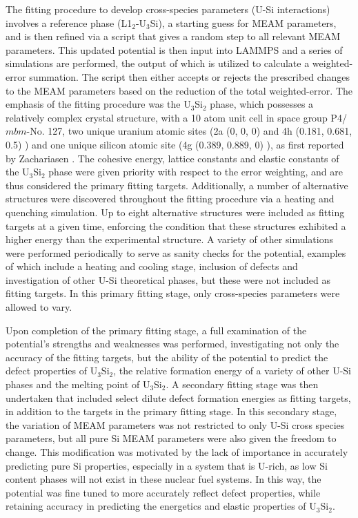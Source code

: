 \documentclass[review]{elsarticle}
\begin{document}
The fitting procedure to develop cross-species parameters (U-Si interactions) involves a reference phase (L1$_{2}$-U$_{3}$Si), a starting guess for MEAM parameters, and is then refined via a script that gives a random step to all relevant MEAM parameters.  This updated potential is then input into LAMMPS \cite{plimpton1995} and a series of simulations are performed, the output of which is utilized to calculate a weighted-error summation.  The script then either accepts or rejects the prescribed changes to the MEAM parameters based on the reduction of the total weighted-error.  The emphasis of the fitting procedure was the U$_{3}$Si$_{2}$ phase, which possesses a relatively complex crystal structure, with a 10 atom unit cell in space group P4/$\textit{mbm}$-No. 127, two unique uranium atomic sites (2a (0, 0, 0) and 4h (0.181, 0.681, 0.5) ) and one unique silicon atomic site (4g (0.389, 0.889, 0) ), as first reported by Zachariasen \cite{zachariasen1949}.  The cohesive energy, lattice constants and elastic constants of the U$_{3}$Si$_{2}$ phase were given priority with respect to the error weighting, and are thus considered the primary fitting targets.  Additionally, a number of alternative structures were discovered throughout the fitting procedure via a heating and quenching simulation.  Up to eight alternative structures were included as fitting targets at a given time, enforcing the condition that these structures exhibited a higher energy than the experimental structure.  A variety of other simulations were performed periodically to serve as sanity checks for the potential, examples of which include a heating and cooling stage, inclusion of defects and investigation of other U-Si theoretical phases, but these were not included as fitting targets.  In this primary fitting stage, only cross-species parameters were allowed to vary.  

Upon completion of the primary fitting stage, a full examination of the potential's strengths and weaknesses was performed, investigating not only the accuracy of the fitting targets, but the ability of the potential to predict the defect properties of U$_{3}$Si$_{2}$, the relative formation energy of a variety of other U-Si phases and the melting point of U$_{3}$Si$_{2}$.  A secondary fitting stage was then undertaken that included select dilute defect formation energies as fitting targets, in addition to the targets in the primary fitting stage.  In this secondary stage, the variation of MEAM parameters was not restricted to only U-Si cross species parameters, but all pure Si MEAM parameters were also given the freedom to change.  This modification was motivated by the lack of importance in accurately predicting pure Si properties, especially in a system that is U-rich, as low Si content phases will not exist in these nuclear fuel systems.  In this way, the potential was fine tuned to more accurately reflect defect properties, while retaining accuracy in predicting the energetics and elastic properties of U$_{3}$Si$_{2}$.  
\end{document}
